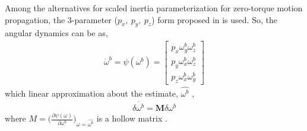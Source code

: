 Among the alternatives for scaled inertia parameterization for zero-torque motion propagation, \cite[\S 4.6]{TweddlePhD} the $3$-parameter ($p_x,~p_y,~p_z$) form proposed in \cite{Aghili07} is used. So, the angular dynamics can be  as,
\begin{align} 
 \dot{\omega}^b = \psi(\omega^b) =  \begin{bmatrix}
 p_x \omega_y^b \omega_z^b \\
  p_y \omega_x^b \omega_z^b \\
   p_z \omega_x^b \omega_y^b  
 \end{bmatrix}
\end{align} 
which  linear approximation about the  estimate, $\hat{\omega^b}$ ,
\begin{align} \label{eq_lin_rot_dyn}
	\delta \dot{\omega^b} = \mathbf{M}\delta{\omega^b}
\end{align} where $M = \Big( \frac{\partial \psi(\omega)}{\partial \omega^b}\Big)_{\omega = \hat{\omega^b}}$ is a hollow matrix \cite{Aghili07}.

